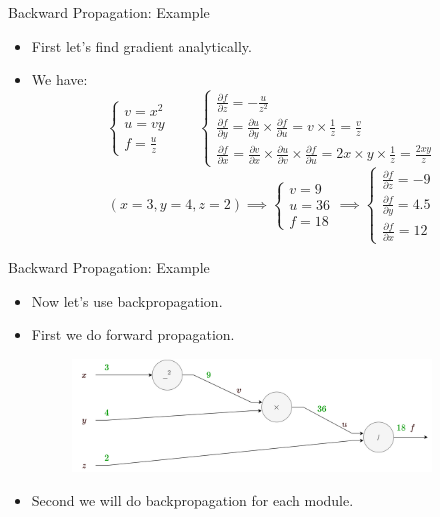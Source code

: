 \documentclass[compress,oilve,t]{beamer}
\begin{document}
\begin{frame}{Backward Propagation: Example}
	\begin{itemize}
		\item First let's find gradient analytically.
		\item We have:
		\[
		\begin{cases}
			v = x^2\\
			u = vy\\
			f = \frac{u}{z}
		\end{cases}
		\qquad
		\begin{cases}
			\frac{\partial f}{\partial z} = -\frac{u}{z^2}\\[0.7em]
			\frac{\partial f}{\partial y} = \frac{\partial u}{\partial y}\times\frac{\partial f}{\partial u} =  v \times \frac{1}{z} = \frac{v}{z}\\[0.7em]
			\frac{\partial f}{\partial x} = \frac{\partial v}{\partial x}\times\frac{\partial u}{\partial v}\times\frac{\partial f}{\partial u} = 2x \times y \times \frac{1}{z} = \frac{2xy}{z}
		\end{cases}
		\]
		\[
		(x=3, y=4, z=2)\implies
		\begin{cases}
			v = 9\\
			u = 36 \\
			f = 18
		\end{cases}
		\implies
		\begin{cases}
			\frac{\partial f}{\partial z} = -9\\[0.7em]
			\frac{\partial f}{\partial y} = 4.5\\[0.7em]
			\frac{\partial f}{\partial x} = 12
		\end{cases}
		\]
	\end{itemize}
\end{frame}

\begin{frame}{Backward Propagation: Example}
	\begin{itemize}
		\item Now let's use backpropagation.
		\item First we do forward propagation.
		\medskip
		\begin{figure}[H]
			\centering
			\includegraphics[width=0.9\textwidth]{Figs/backprop_e2.png}
		\end{figure}
		\medskip
		\item Second we will do backpropagation for each module.
	\end{itemize}
\end{frame}
\end{document}
